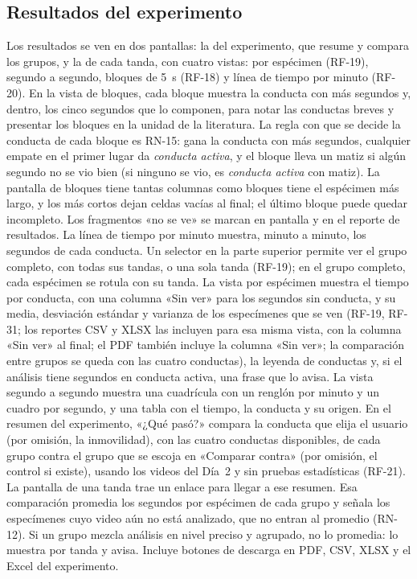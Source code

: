 \subsection{Resultados del experimento}

Los resultados se ven en dos pantallas: la del experimento, que resume y compara los grupos, y la de
cada tanda, con cuatro vistas: por espécimen (RF-19), segundo a segundo, bloques de 5~s (RF-18) y línea de
tiempo por minuto (RF-20). En la vista de bloques, cada bloque muestra la conducta con
más segundos y, dentro, los cinco segundos que lo componen, para notar las conductas
breves y presentar los bloques en la unidad de la literatura. La regla con que se decide
la conducta de cada bloque es RN-15: gana la conducta con más segundos, cualquier empate
en el primer lugar da \textit{conducta activa}, y el bloque lleva un matiz si algún
segundo no se vio bien (si ninguno se vio, es \textit{conducta activa} con matiz). La
pantalla de bloques tiene tantas columnas como bloques tiene el espécimen más largo, y
los más cortos dejan celdas vacías al final; el último bloque puede quedar incompleto.
Los fragmentos «no se ve» se marcan en pantalla y en el reporte de resultados.
La línea de tiempo por minuto muestra, minuto a minuto, los segundos de cada conducta.
Un selector en la parte superior permite ver el grupo completo, con todas sus tandas, o una
sola tanda (RF-19); en el grupo completo, cada espécimen se rotula con su tanda. La vista por espécimen
muestra el tiempo por conducta, con una columna «Sin ver» para los segundos sin conducta, y su media, desviación estándar y varianza de los especímenes que se ven (RF-19, RF-31; los reportes CSV y XLSX las incluyen para esa misma vista, con la columna «Sin ver» al final; el PDF también incluye la columna «Sin ver»; la comparación entre grupos se queda con las cuatro conductas), la
leyenda de conductas y, si el análisis tiene segundos en conducta activa, una frase que lo avisa. La vista
segundo a segundo muestra una cuadrícula con un renglón por minuto y un cuadro por segundo, y una tabla con el
tiempo, la conducta y su origen. En el resumen del experimento, «¿Qué pasó?» compara la conducta que
elija el usuario (por omisión, la inmovilidad), con las cuatro conductas disponibles, de cada grupo contra el
grupo que se escoja en «Comparar contra» (por omisión, el control si existe), usando los videos del Día~2 y sin
pruebas estadísticas (RF-21). La pantalla de una tanda trae un enlace para llegar a ese resumen. Esa
comparación promedia los segundos por espécimen de cada grupo y señala los especímenes
cuyo video aún no está analizado, que no entran al promedio (RN-12). Si un grupo mezcla
análisis en nivel preciso y agrupado, no lo promedia: lo muestra por tanda y avisa. Incluye botones de
descarga en PDF, CSV, XLSX y el Excel del experimento.

